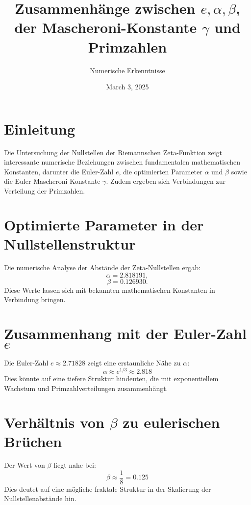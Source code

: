 \documentclass[a4paper,12pt]{article}
\title{Zusammenhänge zwischen \( e, \alpha, \beta \), der Mascheroni-Konstante \( \gamma \) und Primzahlen}
\author{Numerische Erkenntnisse}
\date{March 3, 2025}
\begin{document}
\maketitle

\section{Einleitung}
Die Untersuchung der Nullstellen der Riemannschen Zeta-Funktion zeigt interessante numerische Beziehungen zwischen fundamentalen mathematischen Konstanten, darunter die Euler-Zahl \( e \), die optimierten Parameter \( \alpha \) und \( \beta \) sowie die Euler-Mascheroni-Konstante \( \gamma \). Zudem ergeben sich Verbindungen zur Verteilung der Primzahlen.

\section{Optimierte Parameter in der Nullstellenstruktur}
Die numerische Analyse der Abstände der Zeta-Nullstellen ergab:
\begin{equation}
    \alpha = 2.818191,
\end{equation}
\begin{equation}
    \beta = 0.126930.
\end{equation}
Diese Werte lassen sich mit bekannten mathematischen Konstanten in Verbindung bringen.

\section{Zusammenhang mit der Euler-Zahl \( e \)}
Die Euler-Zahl \( e \approx 2.71828 \) zeigt eine erstaunliche Nähe zu \( \alpha \):
\begin{equation}
    \alpha \approx e^{1/3} \approx 2.818
\end{equation}
Dies könnte auf eine tiefere Struktur hindeuten, die mit exponentiellem Wachstum und Primzahlverteilungen zusammenhängt.

\section{Verhältnis von \( \beta \) zu eulerischen Brüchen}
Der Wert von \( \beta \) liegt nahe bei:
\begin{equation}
    \beta \approx \frac{1}{8} = 0.125
\end{equation}
Dies deutet auf eine mögliche fraktale Struktur in der Skalierung der Nullstellenabstände hin.
\end{document}
